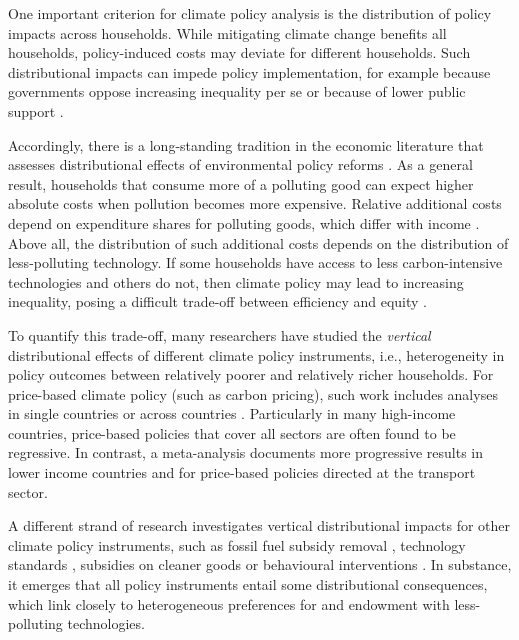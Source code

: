 \documentclass[12pt, a4paper]{article}
\begin{document}
One important criterion for climate policy analysis is the distribution of policy impacts across households. While mitigating climate change benefits all households, policy-induced costs may deviate for different households. Such distributional impacts can impede policy implementation, for example because governments oppose increasing inequality per se or because of lower public support \autocite{Bergquist.2022,Douenne.2022}. 

Accordingly, there is a long-standing tradition in the economic literature that assesses distributional effects of environmental policy reforms \autocite{Cremer.2003,Poterba.1991,Sandmo.1975,Stiglitz.2019}. As a general result, households that consume more of a polluting good can expect higher absolute costs when pollution becomes more expensive. Relative additional costs depend on expenditure shares for polluting goods, which differ with income \autocite{Jacobs.2019,Dorband.2019}. Above all, the distribution of such additional costs depends on the distribution of less-polluting technology. If some households have access to less carbon-intensive technologies and others do not, then climate policy may lead to increasing inequality, posing a difficult trade-off between efficiency and equity \autocite{Hansel.2022,TerryDinan.2016}. 

To quantify this trade-off, many researchers have studied the \textit{vertical} distributional effects of different climate policy instruments, i.e., heterogeneity in policy outcomes between relatively poorer and relatively richer households. For price-based climate policy (such as carbon pricing), such work includes analyses in single countries \autocite{Goulder.2019,Grainger.2010,Rausch.2011,Garaffa.2021,Sterner.2012,Wu.2022} or across countries \autocite{Budolfson.2021,Feindt.2021,Dorband.2019,Steckel.2021b,VogtSchilb.2019,Missbach.2024}. Particularly in many high-income countries, price-based policies that cover all sectors are often found to be regressive. In contrast, a meta-analysis \autocite{Ohlendorf.2021} documents more progressive results in lower income countries and for price-based policies directed at the transport sector.

A different strand of research investigates vertical distributional impacts for other climate policy instruments, such as fossil fuel subsidy removal \autocite{Schaffitzel.2019,Giuliano.2020,DelArzeGranado.2012}, technology standards \autocite{Levinson.2019,Zhao.2022,Bruegge.2019}, subsidies on cleaner goods \autocite{Borenstein.2016,Vaishnav.2017,Winter.2019} or behavioural interventions \autocite{DellaValle.2020,Liebe.2021}. In substance, it emerges that all policy instruments entail some distributional consequences, which link closely to heterogeneous preferences for and endowment with less-polluting technologies. 
\end{document}
